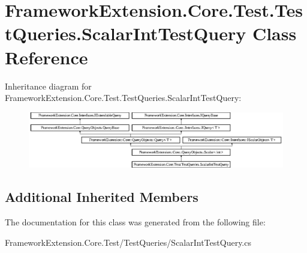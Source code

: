 \hypertarget{class_framework_extension_1_1_core_1_1_test_1_1_test_queries_1_1_scalar_int_test_query}{\section{Framework\-Extension.\-Core.\-Test.\-Test\-Queries.\-Scalar\-Int\-Test\-Query Class Reference}
\label{class_framework_extension_1_1_core_1_1_test_1_1_test_queries_1_1_scalar_int_test_query}
}
Inheritance diagram for Framework\-Extension.\-Core.\-Test.\-Test\-Queries.\-Scalar\-Int\-Test\-Query\-:\begin{figure}[H]
\begin{center}
\leavevmode
\includegraphics[height=2.449694cm]{class_framework_extension_1_1_core_1_1_test_1_1_test_queries_1_1_scalar_int_test_query}
\end{center}
\end{figure}
\subsection*{Additional Inherited Members}


The documentation for this class was generated from the following file\-:\begin{DoxyCompactItemize}
\item 
Framework\-Extension.\-Core.\-Test/\-Test\-Queries/Scalar\-Int\-Test\-Query.\-cs\end{DoxyCompactItemize}
